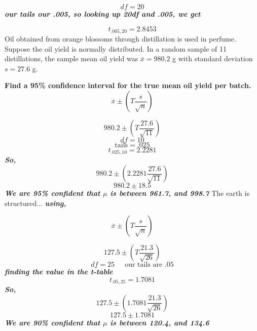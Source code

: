 \documentclass{report}
\begin{document}
$$ df = 20$$
\textit{\textbf{our tails our .005, so looking up 20df and .005, we get}}

$$ t_{.005,20} = 2.8453$$
\bigbreak
\q
Oil obtained from orange blossoms through distillation is used in perfume. Suppose the oil yield is normally distributed. In a random sample of 11 distillations, the sample mean oil yield was $\bar{x} = 980.2$ g with standard deviation $s = 27.6$ g.
\vspace{1mm}

\noindent \textbf{Find a 95\% confidence interval for the true mean oil yield per batch.}
$$  \overline{x} \pm \left(T \frac{s}{\sqrt{n}}\right)$$

$$ 980.2 \pm \left(T \frac{27.6}{\sqrt{11}}\right)$$
$$ df = 10$$
$$\text{tails} = .025$$
$$ t_{.025,10} = 2.2281$$
\textit{\textbf{So,}}
$$ 980.2 \pm \left(2.2281 \frac{27.6}{\sqrt{11}}\right)$$
$$ 980.2 \pm 18.5$$
\textit{\textbf{We are 95\% confident that $\mu$ is between 961.7, and 998.7}}
\bigbreak \noindent
\q
The earth is structured...
\bigbreak \noindent
\textit{\textbf{using,}}

$$  \overline{x} \pm \left(T \frac{s}{\sqrt{n}}\right)$$

$$  127.5 \pm \left(T \frac{21.3}{\sqrt{26}}\right)$$
$$ df = 25 \ \ \ \ \ \text{ our tails are .05}$$
\textit{\textbf{finding the value in the t-table}}
$$ t_{.05,25} = 1.7081$$
\textit{\textbf{So,}}
$$  127.5 \pm \left(1.7081 \frac{21.3}{\sqrt{26}}\right)$$
$$ 127.5 \pm{1.7081}$$
\bigbreak  \noindent
\textit{\textbf{We are 90\% confident that $\mu$ is between 120.4, and 134.6}}
\end{document}

